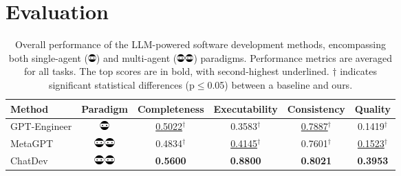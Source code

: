 \documentclass[11pt]{article}
\begin{document}
\section{Evaluation}

\begin{table}[h]
\centering
\begin{tabular}{lccccc}
\toprule[1.5pt]
\textbf{Method} & \textbf{Paradigm} & \textbf{Completeness} & \textbf{Executability} & \textbf{Consistency} & \textbf{Quality} \\
\midrule[0.75pt]
GPT-Engineer & \includegraphics[height=10pt]{figs/p4.png} & \underline{0.5022}$^\dagger$ & 0.3583$^\dagger$ & \underline{0.7887}$^\dagger$ & 0.1419$^\dagger$ \\
MetaGPT & \includegraphics[height=10pt]{figs/p5.png} & 0.4834$^\dagger$ & \underline{0.4145}$^\dagger$ & 0.7601$^\dagger$ & \underline{0.1523}$^\dagger$ \\
ChatDev & \includegraphics[height=10pt]{figs/p5.png} & \textbf{0.5600} & \textbf{0.8800} & \textbf{0.8021} & \textbf{0.3953} \\
\bottomrule[1.5pt]
\end{tabular}
\caption{Overall performance of the LLM-powered software development methods, encompassing both single-agent (\includegraphics[height=8pt]{figs/p4.png}) and multi-agent (\includegraphics[height=8pt]{figs/p5.png}) paradigms. Performance metrics are averaged for all tasks. The top scores are in bold, with second-highest underlined. $\dagger$ indicates significant statistical differences (p$\le$0.05) between a baseline and ours.}
\label{tab:main-results}
\end{table}

\begin{table}[t]
\centering
{}
\caption{Pairwise evaluation results.}
\label{tab:human_eval}
\end{table}
\end{document}
